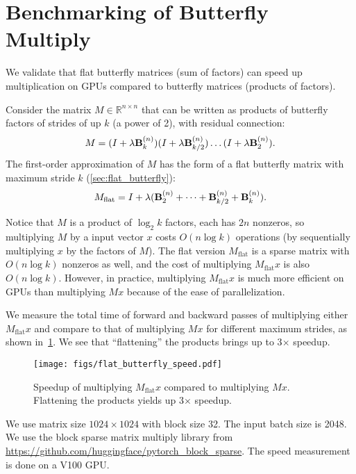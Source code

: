 \section{Benchmarking of Butterfly Multiply}
\label{sec:appx_benchmark}

We validate that flat butterfly matrices (sum of factors) can speed up multiplication on GPUs
compared to butterfly matrices (products of factors).

Consider the matrix $M \in \mathbb{R}^{n \times n}$ that can be written as products of butterfly factors of
strides of up $k$ (a power of 2), with residual connection:
\begin{equation*}
  M = (I + \lambda \mathbf{B}_k^{(n)}) (I + \lambda \mathbf{B}_{k/2}^{(n)}) \dots (I + \lambda \mathbf{B}_2^{(n)}).
\end{equation*}
The first-order approximation of $M$ has the form of a flat butterfly matrix
with maximum stride $k$ (\cref{sec:flat_butterfly}):
\begin{equation*}
  M_\mathrm{flat} = I + \lambda (\mathbf{B}_2^{(n)} + \dots + \mathbf{B}_{k/2}^{(n)} + \mathbf{B}_k^{(n)}).
\end{equation*}

Notice that $M$ is a product of $\log_2 k$ factors, each has $2n$ nonzeros, so
multiplying $M$ by a input vector $x$ costs $O(n \log k)$ operations (by
sequentially multiplying $x$ by the factors of $M$).
The flat version $M_\mathrm{flat}$ is a sparse matrix with $O(n \log k)$
nonzeros as well, and the cost of multiplying $M_\mathrm{flat} x$ is also
$O(n \log k)$.
However, in practice, multiplying $M_\mathrm{flat} x$ is much more efficient on
GPUs than multiplying $Mx$ because of the ease of parallelization.

We measure the total time of forward and backward passes of multiplying either
$M_\mathrm{flat} x$ and compare to that of multiplying $Mx$ for different
maximum strides, as shown
in~\cref{fig:flat_butterfly_speed}.
We see that ``flattening'' the products brings up to 3$\times$ speedup.
\begin{figure}[ht]
  \centering
  \texttt{[image: figs/flat\_butterfly\_speed.pdf]}
  \caption{\label{fig:flat_butterfly_speed}Speedup of multiplying
    $M_\mathrm{flat}x$ compared to multiplying $Mx$. Flattening the products
    yields up 3$\times$ speedup.}
\end{figure}

We use matrix size $1024 \times 1024$ with block size 32.
The input batch size is 2048.
We use the block sparse matrix multiply library from
\url{https://github.com/huggingface/pytorch_block_sparse}.
The speed measurement is done on a V100 GPU.


